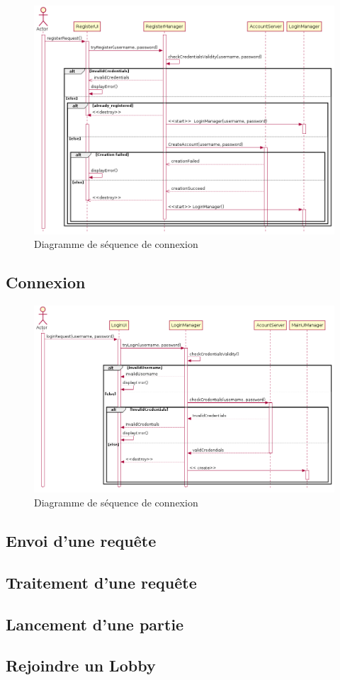 \documentclass{article}
\begin{document}
\begin{figure}[!h]
    \centering
    \includegraphics[width=1\textwidth]{../res/uml/sequence/InscriptionSequence.png}
    \caption{Diagramme de séquence de connexion}
    \label{fig:Royal-Competition}
\end{figure}

\subsection{Connexion}

\begin{figure}[!h]
    \centering
    \includegraphics[width=1\textwidth]{../res/uml/sequence/ConnexionSequence.png}
    \caption{Diagramme de séquence de connexion}
    \label{fig:Royal-Competition}
\end{figure}

\subsection{Envoi d'une requête}

\subsection{Traitement d'une requête}

\subsection{Lancement d'une partie}

\subsection{Rejoindre un Lobby}
\end{document}
